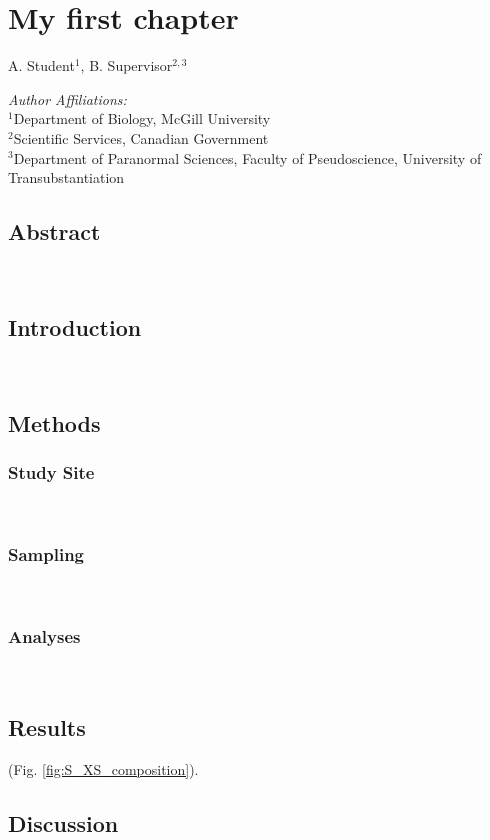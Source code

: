 \chapter{My first chapter}
\begin{center}
{A. Student$^{1}$, B. Supervisor$^{2,3}$}\\
\end{center}
\textit{Author Affiliations:}\\
\normalsize{$^{1}$Department of Biology, McGill University}\\
\normalsize{$^{2}$Scientific Services, Canadian Government}\\
\normalsize{$^{3}$Department of Paranormal Sciences, Faculty of Pseudoscience, University of Transubstantiation}\\
\section{Abstract}
\lipsum[66]
\\
\section{Introduction}
\lipsum[66]\\
\section{Methods}

\subsection*{Study Site}
\lipsum[66]\\
\subsection*{Sampling}
\lipsum[66]\\
\subsection*{Analyses}
\lipsum[66]\\
\section{Results}
\lipsum[66](Fig. \ref{fig:S_XS_composition}).
\\
\section{Discussion}
\lipsum[66]
\\

